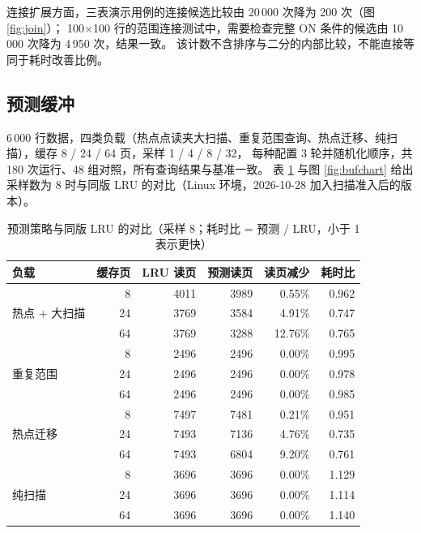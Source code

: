 \documentclass[a4paper,zihao=-4,UTF8,fontset=windows,linespread=1.35]{ctexart}
\begin{document}
连接扩展方面，三表演示用例的连接候选比较由 20\,000 次降为 200 次（图 \ref{fig:join}）；
100$\times$100 行的范围连接测试中，需要检查完整 ON 条件的候选由 10\,000 次降为 4\,950 次，结果一致。
该计数不含排序与二分的内部比较，不能直接等同于耗时改善比例。

\subsection{预测缓冲}\label{sec:exp-buffer}
6\,000 行数据，四类负载（热点点读夹大扫描、重复范围查询、热点迁移、纯扫描），缓存 8 / 24 / 64 页，采样 1 / 4 / 8 / 32，
每种配置 3 轮并随机化顺序，共 180 次运行、48 组对照，所有查询结果与基准一致。
表 \ref{tab:buffer} 与图 \ref{fig:bufchart} 给出采样数为 8 时与同版 LRU 的对比（Linux 环境，2026-10-28 加入扫描准入后的版本）。

\begin{table}[!htb]
\centering\small
\caption{预测策略与同版 LRU 的对比（采样 8；耗时比 = 预测 / LRU，小于 1 表示更快）}\label{tab:buffer}
\begin{tabular}{lrrrrr}
\toprule
负载 & 缓存页 & LRU 读页 & 预测读页 & 读页减少 & 耗时比 \\
\midrule
\multirow{3}{*}{热点 + 大扫描} & 8 & 4011 & 3989 & 0.55\% & 0.962 \\
 & 24 & 3769 & 3584 & 4.91\% & 0.747 \\
 & 64 & 3769 & 3288 & 12.76\% & 0.765 \\
\midrule
\multirow{3}{*}{重复范围} & 8 & 2496 & 2496 & 0.00\% & 0.995 \\
 & 24 & 2496 & 2496 & 0.00\% & 0.978 \\
 & 64 & 2496 & 2496 & 0.00\% & 0.985 \\
\midrule
\multirow{3}{*}{热点迁移} & 8 & 7497 & 7481 & 0.21\% & 0.951 \\
 & 24 & 7493 & 7136 & 4.76\% & 0.735 \\
 & 64 & 7493 & 6804 & 9.20\% & 0.761 \\
\midrule
\multirow{3}{*}{纯扫描} & 8 & 3696 & 3696 & 0.00\% & 1.129 \\
 & 24 & 3696 & 3696 & 0.00\% & 1.114 \\
 & 64 & 3696 & 3696 & 0.00\% & 1.140 \\
\bottomrule
\end{tabular}
\end{table}
\end{document}
